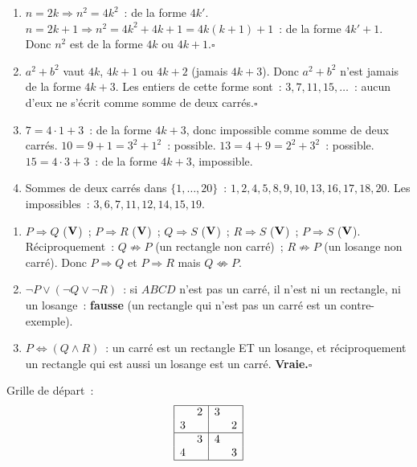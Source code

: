 
\begin{enumerate}
  \item $n=2k\Rightarrow n^2=4k^2$~: de la forme $4k'$.
        $n=2k+1\Rightarrow n^2=4k^2+4k+1=4k(k+1)+1$~: de la forme $4k'+1$.
        Donc $n^2$ est de la forme $4k$ ou $4k+1$.\hfill$\square$
  \item $a^2+b^2$ vaut $4k$, $4k+1$ ou $4k+2$ (jamais $4k+3$).
        Donc $a^2+b^2$ n'est jamais de la forme $4k+3$.
        Les entiers de cette forme sont~: $3,7,11,15,\ldots$~:
        aucun d'eux ne s'\'ecrit comme somme de deux carr\'es.\hfill$\square$
  \item $7=4\cdot1+3$~: de la forme $4k+3$, donc impossible comme somme de deux carr\'es.
        $10=9+1=3^2+1^2$~: possible. $13=4+9=2^2+3^2$~: possible.
        $15=4\cdot3+3$~: de la forme $4k+3$, impossible.
  \item Sommes de deux carr\'es dans $\{1,\ldots,20\}$~:
        $1,2,4,5,8,9,10,13,16,17,18,20$. Les impossibles~: $3,6,7,11,12,14,15,19$.
\end{enumerate}


\begin{enumerate}
  \item $P\Rightarrow Q$ ($\textbf{V}$)~; $P\Rightarrow R$ ($\textbf{V}$)~;
        $Q\Rightarrow S$ ($\textbf{V}$)~; $R\Rightarrow S$ ($\textbf{V}$)~; $P\Rightarrow S$ ($\textbf{V}$).
        R\'eciproquement~: $Q\not\Rightarrow P$ (un rectangle non carr\'e)~;
        $R\not\Rightarrow P$ (un losange non carr\'e).
        Donc $P\Rightarrow Q$ et $P\Rightarrow R$ mais $Q\not\Leftrightarrow P$.
  \item $\lnot P\lor(\lnot Q\lor\lnot R)$~: \og si $ABCD$ n'est pas un carr\'e,
        il n'est ni un rectangle, ni un losange\fg~: \textbf{fausse}
        (un rectangle qui n'est pas un carr\'e est un contre-exemple).
  \item $P\Leftrightarrow (Q\land R)$~:
        un carr\'e est un rectangle ET un losange, et r\'eciproquement
        un rectangle qui est aussi un losange est un carr\'e. \textbf{Vraie.}\hfill$\square$
\end{enumerate}


Grille de d\'epart~:
\[
\begin{array}{|cc|cc|}
\hline
  & 2 & 3 &   \\
3 &   &   & 2 \\
\hline
  & 3 & 4 &   \\
4 &   &   & 3 \\
\hline
\end{array}
\]

